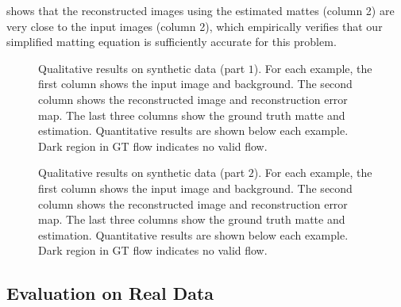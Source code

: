  shows that the reconstructed images using the estimated mattes (column 2) are very close to the input images (column 2), which empirically verifies that our simplified matting equation  is sufficiently accurate for this problem.

\begin{figure}[htbp] \centering
    
    \caption[Qualitative results on synthetic data (part $1$)]{Qualitative results on synthetic data (part $1$). For each example, the first column shows the input image and background. The second column shows the reconstructed image and reconstruction error map. The last three columns show the ground truth matte and estimation. Quantitative results are shown below each example. Dark region in GT flow indicates no valid flow.} \label{fig:qual_synth}
\end{figure}

\begin{figure}[htbp] \centering
    
    \caption[Qualitative results on synthetic data (part $2$)]{Qualitative results on synthetic data (part $2$). For each example, the first column shows the input image and background. The second column shows the reconstructed image and reconstruction error map. The last three columns show the ground truth matte and estimation. Quantitative results are shown below each example. Dark region in GT flow indicates no valid flow.} \label{fig:qual_synth2}
\end{figure}

\clearpage
\subsection{Evaluation on Real Data}
\label{sub:Results}
\begin{table}[htbp] \centering
    \caption[Quantitative results on real data]{Quantitative results on real data. (Value the higher the better.)}
    \label{tab:real_quant}
\end{table}

